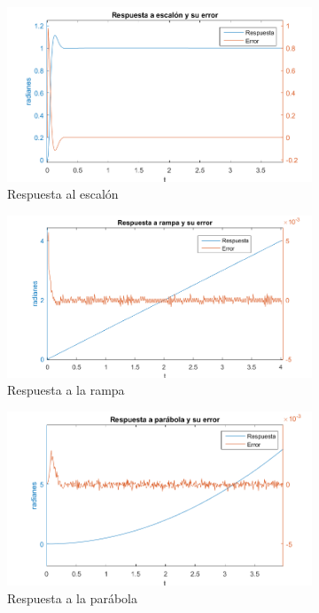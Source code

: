 \documentclass[a4paper]{article}
\begin{document}
\begin{center}
	\begin{figure}[htp]
		\begin{subfigure}{1\textwidth}
			\centering
			\includegraphics[width=12cm]{step2}
			\caption{Respuesta al escalón}
			\label{fig:step}
		\end{subfigure}
	
		\begin{subfigure}{1\textwidth}
			\centering
			\includegraphics[width=12cm]{ramp2}
			\caption{Respuesta a la rampa}
			\label{fig:ramp}
		\end{subfigure}
	
		\begin{subfigure}{1\textwidth}
			\centering
			\includegraphics[width=12cm]{parab2}
			\caption{Respuesta a la parábola}
			\label{fig:parab}
		\end{subfigure}
		\caption{}
		\label{respuestas}
	\end{figure}
\end{center}
\end{document}
